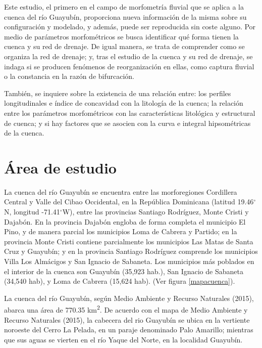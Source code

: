 \documentclass[11pt,]{article}
\begin{document}
Este estudio, el primero en el campo de morfometría fluvial que se
aplica a la cuenca del río Guayubín, proporciona nueva información de la
misma sobre su configuración y modelado, y además, puede ser reproducida
sin coste alguno. Por medio de parámetros morfométricos se busca
identificar qué forma tienen la cuenca y su red de drenaje. De igual
manera, se trata de comprender como se organiza la red de drenaje; y,
tras el estudio de la cuenca y su red de drenaje, se indaga si se
producen fenómenos de reorganización en ellas, como captura fluvial o la
constancia en la razón de bifurcación.

También, se inquiere sobre la existencia de una relación entre: los
perfiles longitudinales e índice de concavidad con la litología de la
cuenca; la relación entre los parámetros morfométricos con las
características litológica y estructural de cuenca; y si hay factores
que se asocien con la curva e integral hipsométricas de la cuenca.

\section{Área de estudio}\label{uxe1rea-de-estudio}

La cuenca del río Guayubín se encuentra entre las morforegiones
Cordillera Central y Valle del Cibao Occidental, en la República
Dominicana (latitud 19.46\(^\circ\)N, longitud -71.41\(^\circ\)W), entre
las provincias Santiago Rodríguez, Monte Cristi y Dajabón. En la
provincia Dajabón engloba de forma completa el municipio El Pino, y de
manera parcial los municipios Loma de Cabrera y Partido; en la provincia
Monte Cristi contiene parcialmente los municipios Las Matas de Santa
Cruz y Guayubín; y en la provincia Santiago Rodríguez comprende los
municipios Villa Los Almácigos y San Ignacio de Sabaneta. Los municipios
más poblados en el interior de la cuenca son Guayubín (35,923 hab.), San
Ignacio de Sabaneta (34,540 hab), y Loma de Cabrera (15,624 hab). (Ver
figura \ref {mapacuenca}).

La cuenca del río Guayubín, según Medio Ambiente y Recurso Naturales
(2015), abarca una área de 770.35 km\textsuperscript{2}. De acuerdo con
el mapa de Medio Ambiente y Recurso Naturales (2015), la cabecera del
rio Guayubín se ubica en la vertiente noroeste del Cerro La Pelada, en
un paraje denominado Palo Amarillo; mientras que sus aguas se vierten en
el río Yaque del Norte, en la localidad Guayubín.
\end{document}
